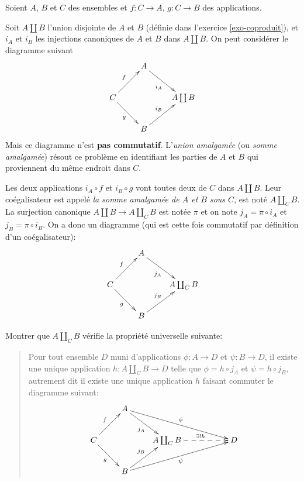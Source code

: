 \begin{exercice}
Soient $A$,  $B$ et $C$  des ensembles et $f :  C\to A$, $g : C\to B$ des applications.

Soit $A\coprod B$ l'union disjointe de $A$ et $B$ (définie dans l'exercice \ref{exo-coproduit}), et $i_A$ et $i_B$ les injections canoniques de $A$ et $B$ dans $A\coprod B$. On peut considérer le diagramme suivant
\[ 
\xymatrix{
&A \ar[dr]_{i_A} &   \\
C\ar[ur]^f\ar[dr]_g& &  A\coprod B    \\
& B \ar[ur]^{i_B} & 
}\]
Mais ce diagramme n'est \textbf{pas commutatif}. L'\emph{union amalgamée}  (ou \emph{somme amalgamée}) résout ce problème en \og identifiant les parties de $A$ et $B$ qui proviennent du même endroit dans $C$\fg{}.


Les deux applications $i_A \circ f$ et $i_B \circ g$ vont toutes deux de $C$ dans $A\coprod B$.  Leur coégalisateur est appelé \emph{la somme amalgamée de $A$ et $B$  sous $C$}, est noté $A\coprod_C B$. La surjection canonique  $A\coprod B \to A\coprod_C B$ est notée $\pi$ et on note $j_A = \pi \circ i_A$ et $j_B = \pi \circ i_B$. On a donc un diagramme (qui est cette fois commutatif par définition d'un coégalisateur):
\[ 
\xymatrix{
&A \ar[dr]_{j_A} &   \\
C\ar[ur]^f\ar[dr]_g& &  A\coprod_C B    \\
& B \ar[ur]^{j_B} & 
}\]

Montrer que $A\coprod_C B$ vérifie la propriété universelle suivante:
\begin{quote}
Pour tout ensemble  $D$ muni d'applications $\phi : A\to D$ et $\psi : B\to D$, il existe une unique application $h : A\coprod_C B \to D$ telle que $\phi = h\circ j_A$ et $\psi = h\circ j_B$, autrement dit il existe une unique application $h$ faisant commuter le diagramme  suivant:
\[ 
\xymatrix{
&A \ar[dr]_{j_A} \ar[drrr]^{\phi}& & & \\
C\ar[ur]^f\ar[dr]_g& &  A\coprod_C B \ar@{-->}[rr]^{\exists !h}  & & D\\
& B \ar[ur]^{j_B} \ar[urrr]_{\psi}& & &
}\]
\end{quote}
\end{exercice}

